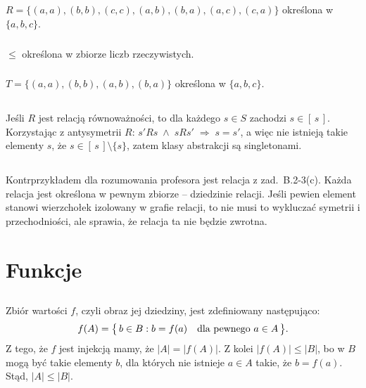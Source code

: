 \subsection{} %
\subsubsection{}
$R = \bigl\{(a,a),(b,b),(c,c),(a,b),(b,a),(a,c),(c,a)\bigr\}$ określona w $\{a,b,c\}$.

\subsubsection{}
$\le$ określona w zbiorze liczb rzeczywistych.

\subsubsection{}
$T = \bigl\{(a,a),(b,b),(a,b),(b,a)\bigr\}$ określona w $\{a,b,c\}$.

\subsection{} %
Jeśli $R$ jest relacją równoważności, to dla każdego $s\in S$ zachodzi $s\in[\,s\,]$. Korzystając z antysymetrii $R$: $s'Rs\;\wedge\;sRs'\;\Rightarrow\;s=s'$, a więc nie istnieją takie elementy $s$, że $s\in[\,s\,]\setminus\{s\}$, zatem klasy abstrakcji są singletonami.

\subsection{} %
Kontrprzykładem dla rozumowania profesora jest relacja z zad.~B.2-3(c). Każda relacja jest określona w pewnym zbiorze -- dziedzinie relacji. Jeśli pewien element stanowi wierzchołek izolowany w grafie relacji, to nie musi to wykluczać symetrii i przechodniości, ale sprawia, że relacja ta nie będzie zwrotna.

\section{Funkcje}

\subsection{} %
\subsubsection{}
Zbiór wartości $f$, czyli obraz jej dziedziny, jest zdefiniowany następująco:
\[
	f(A) = \bigl\{\,b\in B:b=f(a)\quad\hbox{dla pewnego }a\in A\,\bigr\}.
\]
Z tego, że $f$ jest injekcją mamy, że $|A|=|f(A)|$. Z kolei $|f(A)|\le|B|$, bo w $B$ mogą być takie elementy $b$, dla których nie istnieje $a\in A$ takie, że $b=f(a)$. Stąd, $|A|\le|B|$.

